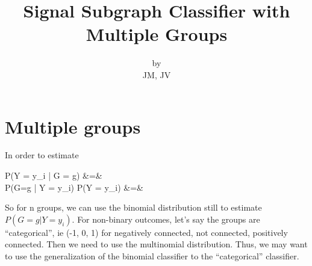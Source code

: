 \documentclass[12pt]{report} \usepackage[left=1.5in, right=1in,
\begin{document}

\title{\bf{\large{Signal Subgraph Classifier with Multiple Groups}}}
\author{by \\
  JM, JV}

\section{Multiple groups}
In order to estimate

\bea
P(Y = y_{i} | G = g) &=& \\
P(G=g | Y = y_{i}) P(Y = y_{i}) &=& 
\eea

So for n groups, we can use the binomial distribution still to estimate $P(G=g | Y = y_{i})$.  For non-binary outcomes, let's say the groups are ``categorical'', ie (-1, 0, 1) for negatively connected, not connected, positively connected.  Then we need to use the multinomial distribution.  Thus, we may want to use the generalization of the binomial classifier to the ``categorical'' classifier.  
\end{document}
